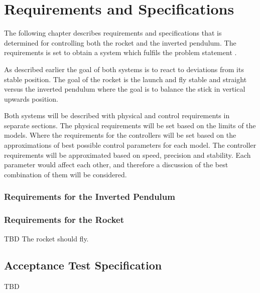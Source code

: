 \chapter{Requirements and Specifications}
The following chapter describes requirements and specifications that is determined for controlling both the rocket and the inverted pendulum. The requirements is set to obtain a system which fulfils the problem statement .

As described earlier the goal of both systems is to react to deviations from its stable position. The goal of the rocket is the launch and fly stable and straight versus the inverted pendulum where the goal is to balance the stick in vertical upwards position.  

Both systems will be described with physical and control requirements in separate sections. The physical requirements will be set based on the limits of the models. Where the requirements for the controllers will be set based on the approximations of best possible control parameters for each model.  
The controller requirements will be approximated based on speed, precision and stability. Each parameter would affect each other, and therefore a discussion of the best combination of them will be considered.

\subsection{Requirements for the Inverted Pendulum}



\subsection{Requirements for the Rocket}
TBD
The rocket should fly.


\section{Acceptance Test Specification}	
TBD